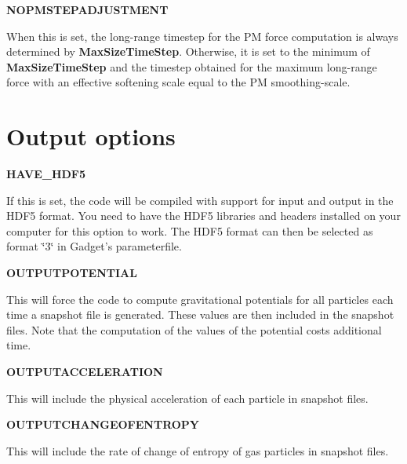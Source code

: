\begin{DoxyItemize}
\item {\bfseries NOPMSTEPADJUSTMENT} \par
 When this is set, the long-\/range timestep for the PM force computation is always determined by {\bfseries MaxSizeTimeStep}. Otherwise, it is set to the minimum of {\bfseries MaxSizeTimeStep} and the timestep obtained for the maximum long-\/range force with an effective softening scale equal to the PM smoothing-\/scale.
\end{DoxyItemize}

\par
 \hypertarget{Gadget-Makefile_secmake6}{}\section{Output options}\label{Gadget-Makefile_secmake6}

\begin{DoxyItemize}
\item {\bfseries HAVE\_\-HDF5} \par
 If this is set, the code will be compiled with support for input and output in the HDF5 format. You need to have the HDF5 libraries and headers installed on your computer for this option to work. The HDF5 format can then be selected as format \char`\"{}3\char`\"{} in Gadget's parameterfile.
\end{DoxyItemize}


\begin{DoxyItemize}
\item {\bfseries OUTPUTPOTENTIAL} \par
 This will force the code to compute gravitational potentials for all particles each time a snapshot file is generated. These values are then included in the snapshot files. Note that the computation of the values of the potential costs additional time.
\end{DoxyItemize}


\begin{DoxyItemize}
\item {\bfseries OUTPUTACCELERATION} \par
 This will include the physical acceleration of each particle in snapshot files.
\end{DoxyItemize}


\begin{DoxyItemize}
\item {\bfseries OUTPUTCHANGEOFENTROPY} \par
 This will include the rate of change of entropy of gas particles in snapshot files.
\end{DoxyItemize}


